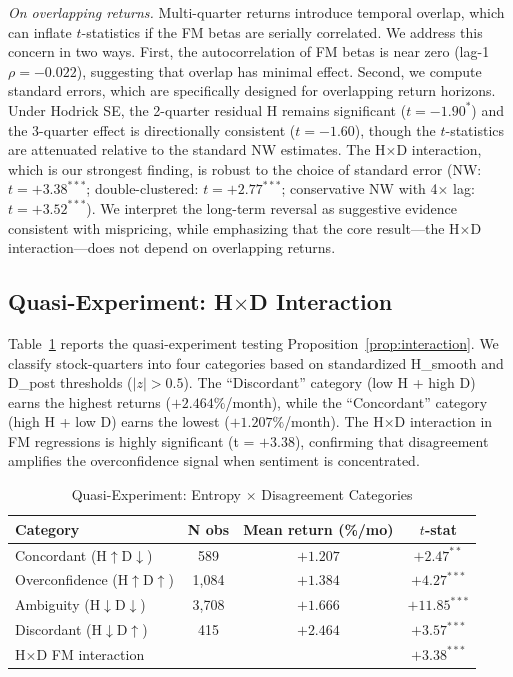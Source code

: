 \documentclass[12pt,a4paper]{article}
\begin{document}
\textit{On overlapping returns.} Multi-quarter returns introduce temporal overlap, which can inflate $t$-statistics if the FM betas are serially correlated. We address this concern in two ways. First, the autocorrelation of FM betas is near zero (lag-1 $\rho = -0.022$), suggesting that overlap has minimal effect. Second, we compute \citet{Hodrick1992} standard errors, which are specifically designed for overlapping return horizons. Under Hodrick SE, the 2-quarter residual H remains significant ($t = -1.90^{*}$) and the 3-quarter effect is directionally consistent ($t = -1.60$), though the $t$-statistics are attenuated relative to the standard NW estimates. The H$\times$D interaction, which is our strongest finding, is robust to the choice of standard error (NW: $t = +3.38^{***}$; double-clustered: $t = +2.77^{***}$; conservative NW with 4$\times$ lag: $t = +3.52^{***}$). We interpret the long-term reversal as suggestive evidence consistent with mispricing, while emphasizing that the core result---the H$\times$D interaction---does not depend on overlapping returns.

\subsection{Quasi-Experiment: H$\times$D Interaction}

Table~\ref{tab:quasi} reports the quasi-experiment testing Proposition~\ref{prop:interaction}. We classify stock-quarters into four categories based on standardized H\_smooth and D\_post thresholds ($|z| > 0.5$). The ``Discordant'' category (low H + high D) earns the highest returns ($+2.464\%$/month), while the ``Concordant'' category (high H + low D) earns the lowest ($+1.207\%$/month). The H$\times$D interaction in FM regressions is highly significant (t = $+3.38$), confirming that disagreement amplifies the overconfidence signal when sentiment is concentrated.

\begin{table}[H]
\centering
\caption{Quasi-Experiment: Entropy $\times$ Disagreement Categories}
\label{tab:quasi}
\small
\begin{tabular}{lccc}
\toprule
Category & N obs & Mean return (\%/mo) & $t$-stat \\
\midrule
Concordant (H$\uparrow$D$\downarrow$) & 589 & $+1.207$ & $+2.47^{**}$ \\
Overconfidence (H$\uparrow$D$\uparrow$) & 1,084 & $+1.384$ & $+4.27^{***}$ \\
Ambiguity (H$\downarrow$D$\downarrow$) & 3,708 & $+1.666$ & $+11.85^{***}$ \\
Discordant (H$\downarrow$D$\uparrow$) & 415 & $+2.464$ & $+3.57^{***}$ \\
\midrule
H$\times$D FM interaction & & & $+3.38^{***}$ \\
\bottomrule
\end{tabular}
\end{table}
\end{document}
